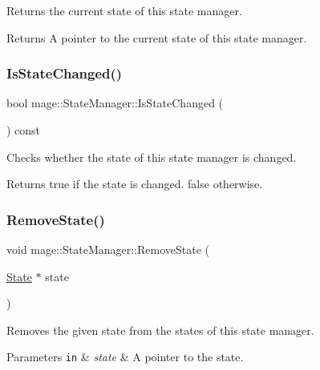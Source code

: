 Returns the current state of this state manager.

\begin{DoxyReturn}{Returns}
A pointer to the current state of this state manager. 
\end{DoxyReturn}
\hypertarget{classmage_1_1_state_manager_abd9c136e1a0f7e375450be5e50e2fc64}{}\label{classmage_1_1_state_manager_abd9c136e1a0f7e375450be5e50e2fc64} 
\subsubsection{\texorpdfstring{Is\+State\+Changed()}{IsStateChanged()}}
{\footnotesize\ttfamily bool mage\+::\+State\+Manager\+::\+Is\+State\+Changed (\begin{DoxyParamCaption}{ }\end{DoxyParamCaption}) const}

Checks whether the state of this state manager is changed.

\begin{DoxyReturn}{Returns}
{\ttfamily true} if the state is changed. {\ttfamily false} otherwise. 
\end{DoxyReturn}
\hypertarget{classmage_1_1_state_manager_ad1589f7792508f0568f673b925a2bdba}{}\label{classmage_1_1_state_manager_ad1589f7792508f0568f673b925a2bdba} 
\subsubsection{\texorpdfstring{Remove\+State()}{RemoveState()}}
{\footnotesize\ttfamily void mage\+::\+State\+Manager\+::\+Remove\+State (\begin{DoxyParamCaption}\item[{\hyperlink{classmage_1_1_state}{State} $\ast$}]{state }\end{DoxyParamCaption})}

Removes the given state from the states of this state manager.


\begin{DoxyParams}[1]{Parameters}
\mbox{\tt in}  & {\em state} & A pointer to the state. \\
\hline
\end{DoxyParams}
\hypertarget{classmage_1_1_state_manager_a48498596d478d107621b1752104e02e3}{}\label{classmage_1_1_state_manager_a48498596d478d107621b1752104e02e3} 
